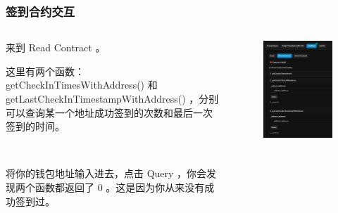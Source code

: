 \documentclass{beamer}
\begin{document}
\begin{frame}
    \frametitle{签到合约交互}

    \begin{columns}
        \begin{column}{0.6\textwidth}
            来到 Read Contract 。

            这里有两个函数：getCheckInTimesWithAddress() 和 getLastCheckInTimestampWithAddress() ，分别可以查询某一个地址成功签到的次数和最后一次签到的时间。

            \

            将你的钱包地址输入进去，点击 Query ，你会发现两个函数都返回了 0 。这是因为你从来没有成功签到过。
        \end{column}

        \begin{column}{0.4\textwidth}
            \begin{figure}
                \centering
                \includegraphics[width=\textwidth]{s7.png}
            \end{figure}
        \end{column}
    \end{columns}

\end{frame}
\end{document}
